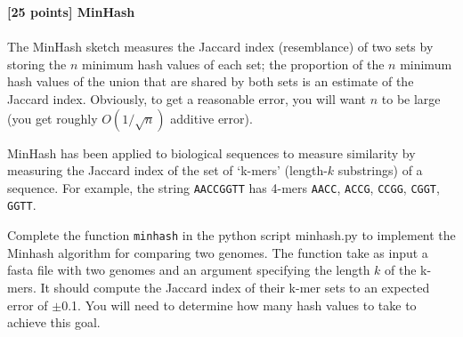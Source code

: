 {\bf [25 points] MinHash}\\
\\
The MinHash sketch measures the Jaccard index (resemblance) of two sets by storing the $n$ minimum hash values of each set; the proportion of the $n$ minimum hash values of the union that are shared by both sets is an estimate of the Jaccard index. Obviously, to get a reasonable error, you will want $n$ to be large (you get roughly \(O(1/\sqrt{n})\) additive error).

MinHash has been applied to biological sequences to measure similarity by measuring the Jaccard index of the set of `k-mers' (length-\(k\) substrings) of a sequence. For example, the string \texttt{AACCGGTT} has 4-mers \texttt{AACC}, \texttt{ACCG}, \texttt{CCGG}, \texttt{CGGT}, \texttt{GGTT}.

Complete the function \texttt{minhash} in the python script minhash.py to implement the Minhash algorithm for comparing two genomes. The function take as input a fasta file with two genomes and an argument specifying the length $k$ of the k-mers. It should compute the Jaccard index of their k-mer sets to an expected error of $\pm$0.1. You will need to determine how many hash values to take to achieve this goal.


